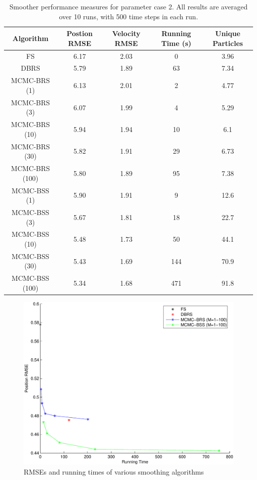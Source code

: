 \documentclass[journal]{IEEEtran}
\begin{document}
\begin{table}[!t]%
\renewcommand{\arraystretch}{1.3}
\caption{Smoother performance measures for parameter case 2. All results are averaged over 10 runs, with 500 time steps in each run.}
\label{tab:case2_performance}
\centering
\begin{tabular}{|c||c|c|c|c|}
\hline
Algorithm & \begin{minipage}[c]{1cm} Postion RMSE \end{minipage} & \begin{minipage}[c]{1cm}  Velocity RMSE \end{minipage} & \begin{minipage}[c]{1cm}  Running Time (s) \end{minipage} & \begin{minipage}[c]{1cm}  Unique Particles \end{minipage} \\
\hline
FS 						& 6.17 & 2.03 & 0 & 3.96 \\
DBRS					& 5.79 & 1.89 & 63 & 7.34 \\
\hline
MCMC-BRS (1)	& 6.13 & 2.01 & 2 & 4.77 \\
MCMC-BRS (3)	& 6.07 & 1.99 & 4 & 5.29 \\
MCMC-BRS (10)	& 5.94 & 1.94 & 10 & 6.1 \\
MCMC-BRS (30)	& 5.82 & 1.91 & 29 & 6.73 \\
MCMC-BRS (100)& 5.80 & 1.89 & 95 & 7.38 \\
\hline
MCMC-BSS (1)	& 5.90 & 1.91 & 9 & 12.6 \\
MCMC-BSS (3)	& 5.67 & 1.81 & 18 & 22.7 \\
MCMC-BSS (10)	& 5.48 & 1.73 & 50 & 44.1 \\
MCMC-BSS (30)	& 5.43 & 1.69 & 144 & 70.9 \\
MCMC-BSS (100)& 5.34 & 1.68 & 471 & 91.8 \\
\hline
\end{tabular}
\end{table}

\begin{figure}[!t]
\centering
\includegraphics[width=0.8\columnwidth]{case1_smoother_comparison_posRMSE_time-crop.pdf}%
\caption{RMSEs and running times of various smoothing algorithms}%
\label{fig:case1_rmse_vs_time}%
\end{figure}
\end{document}
